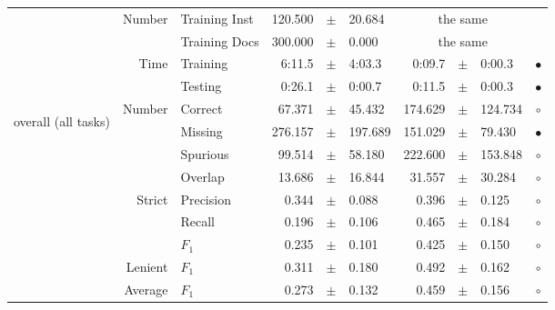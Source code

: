 \begin{longtable}{|r|r|l||rcl|rcl|c|}
\cline{2-10} & \multirow{2}{*}{    Number} &   Training Inst &     120.500 &  $\pm$  &      20.684 &    \multicolumn{3}{c|}{the same}         &  \\
\cline{3-10} &                             &   Training Docs &     300.000 &  $\pm$  &       0.000 &    \multicolumn{3}{c|}{the same}         &  \\
\cline{2-10} & \multirow{2}{*}{      Time} &        Training &      6:11.5 &  $\pm$  &      4:03.3 &      0:09.7 &  $\pm$  &      0:00.3 & $\bullet$ \\
\cline{3-10} &                             &         Testing &      0:26.1 &  $\pm$  &      0:00.7 &      0:11.5 &  $\pm$  &      0:00.3 & $\bullet$ \\
\hline
\hline
\multirow{11}{*}{\begin{sideways}overall (all tasks)\end{sideways} }
             & \multirow{4}{*}{    Number} &         Correct &      67.371 &  $\pm$  &      45.432 &     174.629 &  $\pm$  &     124.734 & $\circ$ \\
\cline{3-10} &                             &         Missing &     276.157 &  $\pm$  &     197.689 &     151.029 &  $\pm$  &      79.430 & $\bullet$ \\
\cline{3-10} &                             &        Spurious &      99.514 &  $\pm$  &      58.180 &     222.600 &  $\pm$  &     153.848 & $\circ$ \\
\cline{3-10} &                             &         Overlap &      13.686 &  $\pm$  &      16.844 &      31.557 &  $\pm$  &      30.284 & $\circ$ \\
\cline{2-10} & \multirow{3}{*}{    Strict} &       Precision &       0.344 &  $\pm$  &       0.088 &       0.396 &  $\pm$  &       0.125 & $\circ$ \\
\cline{3-10} &                             &          Recall &       0.196 &  $\pm$  &       0.106 &       0.465 &  $\pm$  &       0.184 & $\circ$ \\
\cline{3-10} &                             &           $F_1$ &       0.235 &  $\pm$  &       0.101 &       0.425 &  $\pm$  &       0.150 & $\circ$ \\
\cline{2-10} &                     Lenient &           $F_1$ &       0.311 &  $\pm$  &       0.180 &       0.492 &  $\pm$  &       0.162 & $\circ$ \\
\cline{2-10} &                     Average &           $F_1$ &       0.273 &  $\pm$  &       0.132 &       0.459 &  $\pm$  &       0.156 & $\circ$ \\

\end{longtable}
